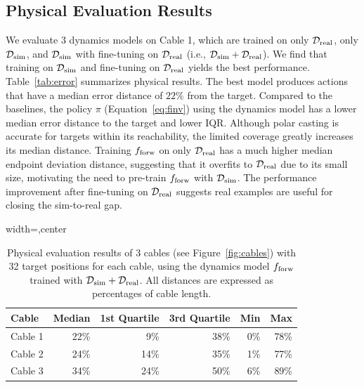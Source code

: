 \documentclass[letterpaper, 10 pt, conference]{ieeeconf}  %
\begin{document}
\subsection{Physical Evaluation Results}
\label{ssec:physical-evaluation}
We evaluate 3 dynamics models on Cable 1, which are trained on only $\mathcal{D}_{\rm real}$, only $\mathcal{D}_{\rm sim}$, and $\mathcal{D}_{\rm sim}$ with fine-tuning on $\mathcal{D}_{\rm real}$ (i.e., $\mathcal{D}_{\rm sim} + \mathcal{D}_{\rm real}$). We find that training on $\mathcal{D}_{\rm sim}$ and fine-tuning on $\mathcal{D}_{\rm real}$ yields the best performance. Table~\ref{tab:error} summarizes physical results. The best model produces actions that have a median error distance of $22\%$ from the target. Compared to the baselines, the policy $\pi$ (Equation~\ref{eq:finv}) using the dynamics model has a lower median error distance to the target and lower IQR. Although polar casting is accurate for targets within its reachability, the limited coverage greatly increases its median distance. Training $f_{\rm forw}$ on only $\mathcal{D}_{\rm real}$ has a much higher median endpoint deviation distance, suggesting that it overfits to $\mathcal{D}_{\rm real}$ due to its small size, motivating the need to pre-train $f_{\rm forw}$ with $\mathcal{D}_{\rm sim}$. The performance improvement after fine-tuning on $\mathcal{D}_{\rm real}$ suggests real examples are useful for closing the sim-to-real gap.

\begin{table}[t]
  \setlength\tabcolsep{5.0pt}
  \centering
  \caption{
    Physical evaluation results of 3 cables (see Figure~\ref{fig:cables}) with 32 target positions for each cable, using the dynamics model $f_{\rm forw}$ trained with $\mathcal{D}_{\rm sim} + \mathcal{D}_{\rm real}$. All distances are expressed as percentages of cable length. 
  }
  \small
  \begin{adjustbox}{width=\columnwidth,center}
    \centering
  \begin{tabular}{@{}lrrrrr}
  \toprule
  Cable      & Median & 1st Quartile & 3rd Quartile  & Min & Max   \\
  \midrule
  Cable 1    & 22\% & 9\% & 38\%& 0\% &78\%   \\
  Cable 2    & 24\% & 14\% & 35\%& 1\% &77\%   \\
  Cable 3   & 34\% & 24\% & 50\%& 6\% & 89\% \\
  \toprule
  \end{tabular}
  \end{adjustbox}
  \vspace{-5pt}
  \label{tab:results}
\end{table}  
\end{document}
